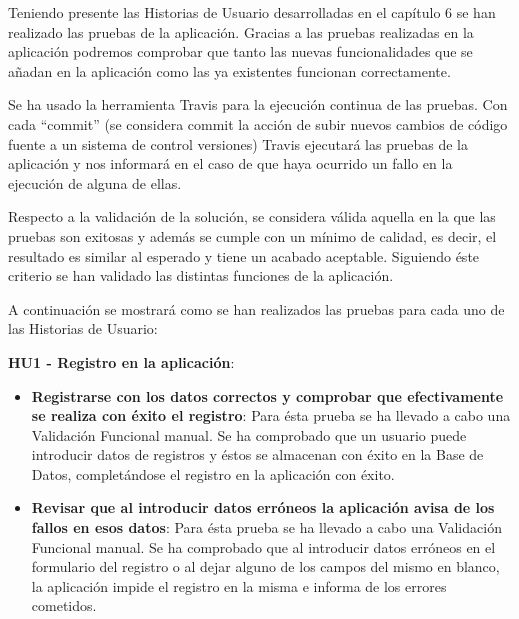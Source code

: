 \documentclass[11pt,openany]{book}
\begin{document}
Teniendo presente las Historias de Usuario desarrolladas en el capítulo 6 se han realizado las pruebas de la aplicación. Gracias a las pruebas realizadas en la aplicación podremos comprobar que tanto las nuevas funcionalidades que se añadan en la aplicación como las ya existentes funcionan correctamente.

Se ha usado la herramienta Travis para la ejecución continua de las pruebas. Con cada ``commit'' (se considera commit la acción de subir nuevos cambios de código fuente a un sistema de control versiones) Travis ejecutará las pruebas de la aplicación y nos informará en el caso de que haya ocurrido un fallo en la ejecución de alguna de ellas.

Respecto a la validación de la solución, se considera válida aquella en la que las pruebas son exitosas y además se cumple con un mínimo de calidad, es decir, el resultado es similar al esperado y tiene un acabado aceptable. Siguiendo éste criterio se han validado las distintas funciones de la aplicación. 

A continuación se mostrará como se han realizados las pruebas para cada uno de las Historias de Usuario:

\textbf{HU1 - Registro en la aplicación}:

\begin{itemize}
\item\textbf{Registrarse con los datos correctos y comprobar que efectivamente se realiza con éxito el registro}: Para ésta prueba se ha llevado a cabo una Validación Funcional manual. Se ha comprobado que un usuario puede introducir datos de registros y éstos se almacenan con éxito en la Base de Datos, completándose el registro en la aplicación con éxito.
\item\textbf{Revisar que al introducir datos erróneos la aplicación avisa de los fallos en esos datos}: Para ésta prueba se ha llevado a cabo una Validación Funcional manual. Se ha comprobado que al introducir datos erróneos en el formulario del registro o al dejar alguno de los campos del mismo en blanco, la aplicación impide el registro en la misma e informa de los errores cometidos.
\end{itemize}
\end{document}

